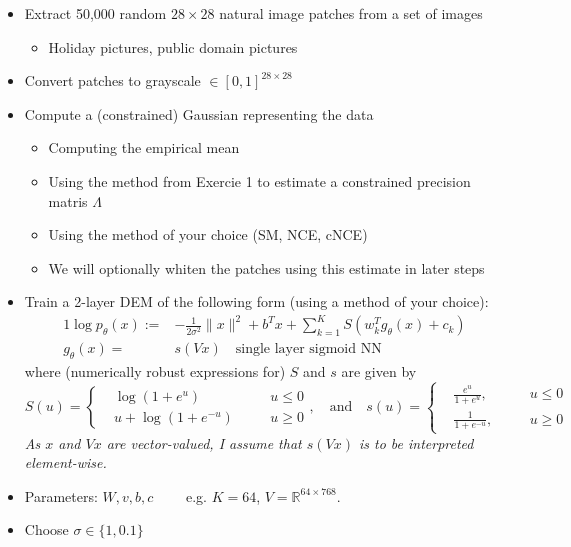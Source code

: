 \documentclass[a4paper]{article}
\begin{document}
\begin{itemize}
\item Extract 50,000 random $28\times 28$ natural image patches from a set of images
\begin{itemize}
\item Holiday pictures, public domain pictures
\end{itemize}

\item Convert patches to grayscale $\in [0,1]^{28\times28}$

\item Compute a (constrained) Gaussian representing the data
\begin{itemize}
\item Computing the empirical mean
\item Using the method from Exercie 1 to estimate a constrained precision matris $\Lambda$
\item Using the method of your choice (SM, NCE, cNCE)
\item We will optionally whiten the patches using this estimate in later steps
\end{itemize}

\item Train a 2-layer DEM of the following form (using a method of your choice):
\begin{alignat*}{1}
\log p_\theta(x) := &-\frac{1}{2\sigma^2} \|x\|^2 + b^T x + \sum_{k=1}^K S\left(w_k^T g_\theta(x) + c_k\right)\\
g_\theta(x) = \ &s(Vx) \quad \text{single layer sigmoid NN}
\end{alignat*}
where (numerically robust expressions for) $S$ and $s$ are given by
$$S(u) = \left\{ \begin{aligned} &\log(1 + e^u) \quad &&u \leq 0\\ &u + \log(1 + e^{-u}) \quad &&u \geq 0\end{aligned}\right. , \quad \text{and} \quad s(u) = \left\{ \begin{aligned} &\frac{e^u}{1 + e^u} , \quad &&u \leq 0\\ &\frac{1}{1 + e^{-u}}, \quad &&u \geq 0\end{aligned}\right.$$
\textit{As $x$ and $Vx$ are vector-valued, I assume that $s(Vx)$ is to be interpreted element-wise.}

\item Parameters: $W, v, b, c \qquad$ e.g. $K = 64$, $V = \mathbb{R}^{64 \times 768}$.

\item Choose $\sigma \in \{1,0.1\}$


\end{itemize}
\end{document}
